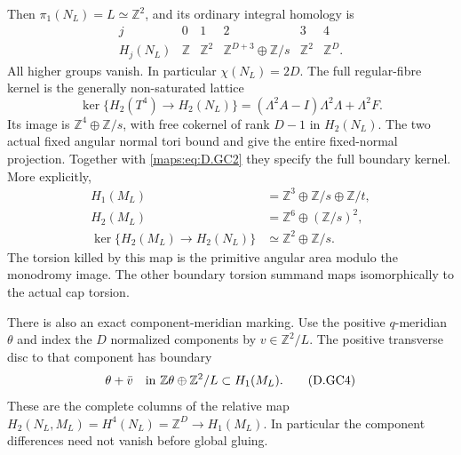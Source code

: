 \begin{theorem}
Then $\pi_1(N_L)=L\simeq\mathbb Z^2$, and its ordinary
integral homology is
\[
 \begin{array}{c|ccccc}
 j&0&1&2&3&4\\ \hline
 H_j(N_L)&\mathbb Z&\mathbb Z^2&
       \mathbb Z^{D+3}\oplus\mathbb Z/s&
       \mathbb Z^2&\mathbb Z^D .
 \end{array}                                             \tag{D.GC1}\label{maps:eq:D.GC1}
\]
All higher groups vanish. In particular $\chi(N_L)=2D$.
The full regular-fibre kernel is the generally
non-saturated lattice
\[
 \ker\{H_2(T^4)\to H_2(N_L)\}
       =(\Lambda^2A-I)\Lambda^2\Lambda+\Lambda^2F .
                                                        \tag{D.GC2}\label{maps:eq:D.GC2}
\]
Its image is $\mathbb Z^4\oplus\mathbb Z/s$, with
free cokernel of rank $D-1$ in $H_2(N_L)$.
The two actual fixed angular normal tori bound
and give the entire fixed-normal projection.
Together with \eqref{maps:eq:D.GC2} they specify the full
boundary kernel. More explicitly,
\[
 \begin{split}
 H_1(M_L)&=\mathbb Z^3\oplus\mathbb Z/s\oplus\mathbb Z/t,\\
 H_2(M_L)&=\mathbb Z^6\oplus(\mathbb Z/s)^2,\\
 \ker\{H_2(M_L)\to H_2(N_L)\}
             &\simeq\mathbb Z^2\oplus\mathbb Z/s .
 \end{split}                                             \tag{D.GC3}\label{maps:eq:D.GC3}
\]
The torsion killed by this map is the primitive
angular area modulo the monodromy image. The other
boundary torsion summand maps isomorphically to
the actual cap torsion.

There is also an exact component-meridian marking.
Use the positive $q$-meridian $\theta$ and index
the $D$ normalized components by $v\in\mathbb Z^2/L$.
The positive transverse disc to that component has
boundary
\[
                     \theta+\bar v
           \quad\hbox{in }\mathbb Z\theta\oplus\mathbb Z^2/L
                     \subset H_1(M_L).                  \tag{D.GC4}\label{maps:eq:D.GC4}
\]
These are the complete columns of the relative
map $H_2(N_L,M_L)=H^4(N_L)=\mathbb Z^D\to H_1(M_L)$.
In particular the component differences need not
vanish before global gluing.

\end{theorem}


